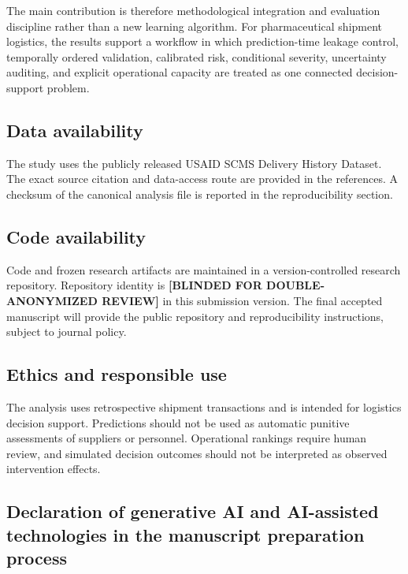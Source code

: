 \documentclass[
]{article}
\begin{document}
The main contribution is therefore methodological integration and
evaluation discipline rather than a new learning algorithm. For
pharmaceutical shipment logistics, the results support a workflow in
which prediction-time leakage control, temporally ordered validation,
calibrated risk, conditional severity, uncertainty auditing, and
explicit operational capacity are treated as one connected
decision-support problem.

\subsection{Data availability}\label{data-availability}

The study uses the publicly released USAID SCMS Delivery History
Dataset. The exact source citation and data-access route are provided in
the references. A checksum of the canonical analysis file is reported in
the reproducibility section.

\subsection{Code availability}\label{code-availability}

Code and frozen research artifacts are maintained in a
version-controlled research repository. Repository identity is
\textbf{{[}BLINDED FOR DOUBLE-ANONYMIZED REVIEW{]}} in this submission
version. The final accepted manuscript will provide the public
repository and reproducibility instructions, subject to journal policy.

\subsection{Ethics and responsible
use}\label{ethics-and-responsible-use}

The analysis uses retrospective shipment transactions and is intended
for logistics decision support. Predictions should not be used as
automatic punitive assessments of suppliers or personnel. Operational
rankings require human review, and simulated decision outcomes should
not be interpreted as observed intervention effects.

\subsection{Declaration of generative AI and AI-assisted technologies in
the manuscript preparation
process}\label{declaration-of-generative-ai-and-ai-assisted-technologies-in-the-manuscript-preparation-process}
\end{document}

